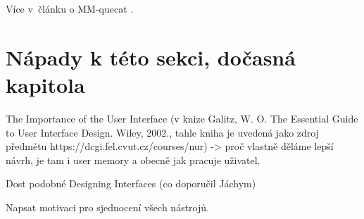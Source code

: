 Více v~článku o MM-quecat \cite{MM_quecat}.


\section{Nápady k této sekci, dočasná kapitola}

The Importance of the User Interface (v knize Galitz, W. O. The Essential Guide to User Interface Design. Wiley, 2002., tahle kniha je uvedená jako zdroj předmětu https://dcgi.fel.cvut.cz/courses/nur) -> proč vlastně děláme lepší návrh, je tam i user memory a obecně jak pracuje uživatel.

Dost podobné Designing Interfaces (co doporučil Jáchym)

Napsat motivaci pro sjednocení všech nástrojů.
